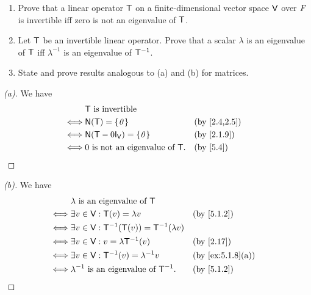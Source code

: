 \begin{ex}\label{ex:5.1.8}
	\begin{enumerate}
		\item Prove that a linear operator \(\mathsf{T}\) on a finite-dimensional vector space \(\mathsf{V}\) over \(\mathit{F}\) is invertible iff zero is not an eigenvalue of \(\mathsf{T}\).
		\item Let \(\mathsf{T}\) be an invertible linear operator.
		      Prove that a scalar \(\lambda\) is an eigenvalue of \(\mathsf{T}\) iff \(\lambda^{-1}\) is an eigenvalue of \(\mathsf{T}^{-1}\).
		\item State and prove results analogous to (a) and (b) for matrices.
	\end{enumerate}
\end{ex}

\begin{proof}[(a)]
	We have
	\begin{align*}
		     & \T \text{ is invertible}                                 \\
		\iff & \ns{\T} = \set{\zv}                    &  & \by{2.4,2.5} \\
		\iff & \ns{\T - 0 \IT[\V]} = \set{\zv}        &  & \by{2.1.9}   \\
		\iff & 0 \text{ is not an eigenvalue of } \T. &  & \by{5.4}
	\end{align*}
\end{proof}

\begin{proof}[(b)]
	We have
	\begin{align*}
		     & \lambda \text{ is an eigenvalue of } \T                                      \\
		\iff & \exists v \in \V : \T(v) = \lambda v                   &  & \by{5.1.2}       \\
		\iff & \exists v \in \V : \T^{-1}(\T(v)) = \T^{-1}(\lambda v)                       \\
		\iff & \exists v \in \V : v = \lambda \T^{-1}(v)              &  & \by{2.17}        \\
		\iff & \exists v \in \V : \T^{-1}(v) = \lambda^{-1} v         &  & \by{ex:5.1.8}[a] \\
		\iff & \lambda^{-1} \text{ is an eigenvalue of } \T^{-1}.     &  & \by{5.1.2}
	\end{align*}
\end{proof}

